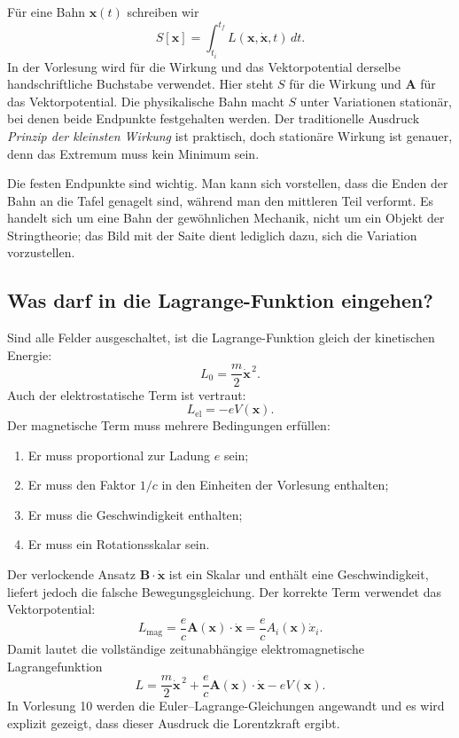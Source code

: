 Für eine Bahn \(\mathbf x(t)\) schreiben wir
\begin{equation}
  S[\mathbf x]
  =
  \int_{t_i}^{t_f}L(\mathbf x,\dot{\mathbf x},t)\,dt.
\end{equation}
In der Vorlesung wird für die Wirkung und das Vektorpotential derselbe handschriftliche Buchstabe verwendet. Hier steht \(S\) für die Wirkung und \(\mathbf A\) für das Vektorpotential. Die physikalische Bahn macht \(S\) unter Variationen stationär, bei denen beide Endpunkte festgehalten werden. Der traditionelle Ausdruck \emph{Prinzip der kleinsten Wirkung} ist praktisch, doch stationäre Wirkung ist genauer, denn das Extremum muss kein Minimum sein.

Die festen Endpunkte sind wichtig. Man kann sich vorstellen, dass die Enden der Bahn an die Tafel genagelt sind, während man den mittleren Teil verformt. Es handelt sich um eine Bahn der gewöhnlichen Mechanik, nicht um ein Objekt der Stringtheorie; das Bild mit der Saite dient lediglich dazu, sich die Variation vorzustellen.

\subsection{Was darf in die Lagrange-Funktion eingehen?}

Sind alle Felder ausgeschaltet, ist die Lagrange-Funktion gleich der kinetischen Energie:
\begin{equation}
  L_0=\frac{m}{2}\dot{\mathbf x}^{\,2}.
\end{equation}
Auch der elektrostatische Term ist vertraut:
\begin{equation}
  L_{\mathrm{el}}=-eV(\mathbf x).
\end{equation}
Der magnetische Term muss mehrere Bedingungen erfüllen:
\begin{enumerate}
  \item Er muss proportional zur Ladung \(e\) sein;
  \item Er muss den Faktor \(1/c\) in den Einheiten der Vorlesung enthalten;
  \item Er muss die Geschwindigkeit enthalten;
  \item Er muss ein Rotationsskalar sein.
\end{enumerate}

Der verlockende Ansatz \(\mathbf B\cdot\dot{\mathbf x}\) ist ein Skalar und enthält eine Geschwindigkeit, liefert jedoch die falsche Bewegungsgleichung. Der korrekte Term verwendet das Vektorpotential:
\begin{equation}
  L_{\mathrm{mag}}
  =
  \frac{e}{c}\mathbf A(\mathbf x)\cdot\dot{\mathbf x}
  =
  \frac{e}{c}A_i(\mathbf x)\dot x_i.
\end{equation}
Damit lautet die vollständige zeitunabhängige elektromagnetische Lagrangefunktion
\begin{equation}
  \boxed{
  L
  =
  \frac{m}{2}\dot{\mathbf x}^{\,2}
  +\frac{e}{c}\mathbf A(\mathbf x)\cdot\dot{\mathbf x}
  -eV(\mathbf x)
  }.
\end{equation}
In Vorlesung 10 werden die Euler--Lagrange-Gleichungen angewandt und es wird explizit gezeigt, dass dieser Ausdruck die Lorentzkraft ergibt.

